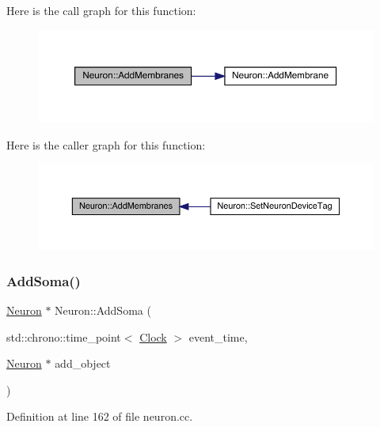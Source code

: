 Here is the call graph for this function\+:
\nopagebreak
\begin{figure}[H]
\begin{center}
\leavevmode
\includegraphics[width=350pt]{class_neuron_a9e1f79bf8e991893f4ef318841932a13_cgraph}
\end{center}
\end{figure}
Here is the caller graph for this function\+:
\nopagebreak
\begin{figure}[H]
\begin{center}
\leavevmode
\includegraphics[width=350pt]{class_neuron_a9e1f79bf8e991893f4ef318841932a13_icgraph}
\end{center}
\end{figure}
\mbox{\label{class_neuron_a6198fa352056e3bbe1e979adf088b900}} 
\subsubsection{\texorpdfstring{Add\+Soma()}{AddSoma()}}
{\footnotesize\ttfamily \hyperlink{class_neuron}{Neuron} $\ast$ Neuron\+::\+Add\+Soma (\begin{DoxyParamCaption}\item[{std\+::chrono\+::time\+\_\+point$<$ \hyperlink{universe_8h_a0ef8d951d1ca5ab3cfaf7ab4c7a6fd80}{Clock} $>$}]{event\+\_\+time,  }\item[{\hyperlink{class_neuron}{Neuron} $\ast$}]{add\+\_\+object }\end{DoxyParamCaption})}



Definition at line 162 of file neuron.\+cc.

